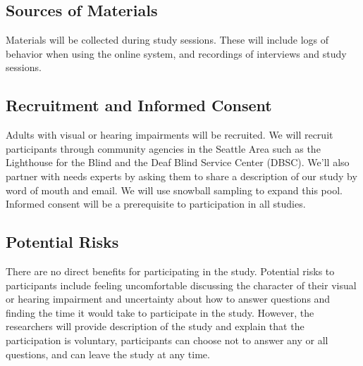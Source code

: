 \subsection{Sources of Materials}

Materials will be collected during study sessions. These will include logs of behavior when using the online system, and recordings of interviews and study sessions. 

\subsection{Recruitment and Informed Consent}
Adults with visual or hearing impairments will be recruited.
We will recruit participants through community agencies in the Seattle Area such as the Lighthouse for the Blind and the Deaf Blind Service Center (DBSC). We’ll also partner with needs experts by asking them to share a description of our study by word of mouth and email. We will use snowball sampling to expand this pool. Informed consent will be a prerequisite to participation in all studies. 

\subsection{ Potential Risks}

There are no direct benefits for participating in the study. Potential risks to participants include feeling uncomfortable discussing the character of their visual or hearing impairment and uncertainty about how to answer questions and finding the time it would take to participate in the study. However, the researchers will provide description of the study and explain that the participation is voluntary, participants can choose not to answer any or all questions, and can leave the study at any time. 

